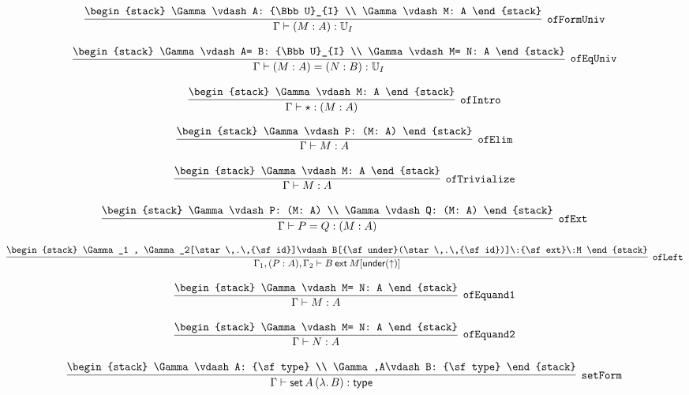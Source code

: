 \[
\infer[{\tt ofFormUniv}]{\Gamma \vdash (M: A): {\Bbb U}_{I}}{
\begin{stack}
\Gamma \vdash A: {\Bbb U}_{I}
\\
\Gamma \vdash M: A
\end{stack}}
\]

\[
\infer[{\tt ofEqUniv}]{\Gamma \vdash (M: A)= (N: B): {\Bbb U}_{I}}{
\begin{stack}
\Gamma \vdash A= B: {\Bbb U}_{I}
\\
\Gamma \vdash M= N: A
\end{stack}}
\]

\[
\infer[{\tt ofIntro}]{\Gamma \vdash \star : (M: A)}{
\begin{stack}
\Gamma \vdash M: A
\end{stack}}
\]

\[
\infer[{\tt ofElim}]{\Gamma \vdash M: A}{
\begin{stack}
\Gamma \vdash P: (M: A)
\end{stack}}
\]

\[
\infer[{\tt ofTrivialize}]{\Gamma \vdash M: A}{
\begin{stack}
\Gamma \vdash M: A
\end{stack}}
\]

\[
\infer[{\tt ofExt}]{\Gamma \vdash P= Q: (M: A)}{
\begin{stack}
\Gamma \vdash P: (M: A)
\\
\Gamma \vdash Q: (M: A)
\end{stack}}
\]

\[
\infer[{\tt ofLeft}]{\Gamma_1 ,(P: A), \Gamma_2 \vdash B\:{\sf ext}\:M[{\sf under}(\uparrow )]}{
\begin{stack}
\Gamma_1 , \Gamma_2[\star \,.\,{\sf id}]\vdash B[{\sf under}(\star \,.\,{\sf id})]\:{\sf ext}\:M
\end{stack}}
\]

\[
\infer[{\tt ofEquand1}]{\Gamma \vdash M: A}{
\begin{stack}
\Gamma \vdash M= N: A
\end{stack}}
\]

\[
\infer[{\tt ofEquand2}]{\Gamma \vdash N: A}{
\begin{stack}
\Gamma \vdash M= N: A
\end{stack}}
\]

\[
\infer[{\tt setForm}]{\Gamma \vdash {\sf set}\,A\,(\lambda .\,B): {\sf type}}{
\begin{stack}
\Gamma \vdash A: {\sf type}
\\
\Gamma ,A\vdash B: {\sf type}
\end{stack}}
\]

